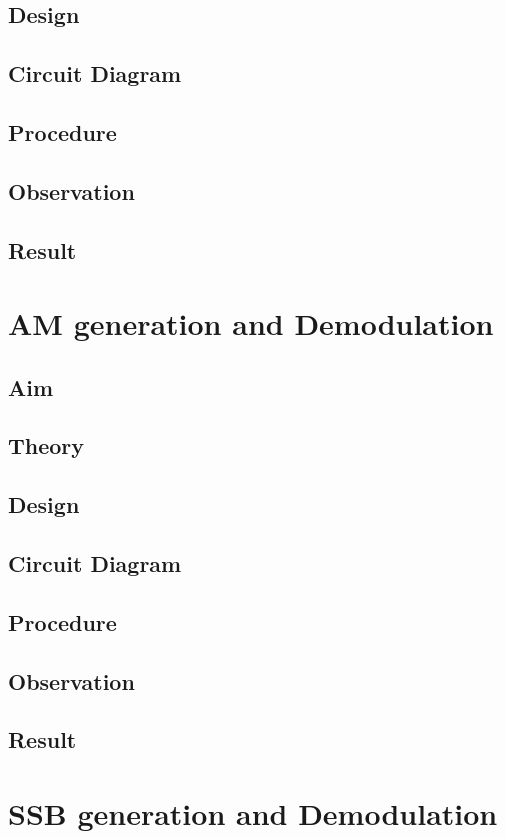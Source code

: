 \documentclass{book}
\begin{document}
\section*{Design}
\section*{Circuit Diagram}
\section*{Procedure}
\section*{Observation}
\section*{Result}

\chapter[AM generation and Demodulation]{AM generation and Demodulation}
\section*{Aim}
\section*{Theory}
\section*{Design}
\section*{Circuit Diagram}
\section*{Procedure}
\section*{Observation}
\section*{Result}
\chapter[SSB generation and Demodulation]{SSB generation and Demodulation}
\end{document}
